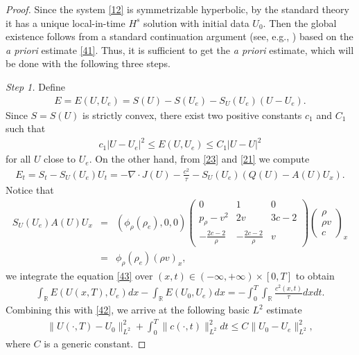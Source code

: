\documentclass{article}
\theoremstyle{plain}
\begin{document}
\begin{proof}
Since the system  \eqref{12} is symmetrizable hyperbolic, by the standard theory
\cite{majda1984compressible, kato1975cauchy} it has a unique local-in-time $H^s$ solution with initial data $U_0$. Then the global existence follows from a standard continuation argument (see, e.g., \cite{yong2004entropy}) based on the {\it a priori} estimate \eqref{41}. Thus, it is sufficient to get the {\it a priori} estimate, which will be done with the following three steps.


\emph{Step 1.} Define
\begin{eqnarray*}
E=E(U,U_e) = S(U)-S(U_e)-S_U(U_e)(U-U_e).
\end{eqnarray*}
Since $S=S(U)$ is strictly convex, there exist two positive constants $c_1$ and $C_1$ such that
\begin{eqnarray}\label{42}
c_1 |U-U_e|^2 \le E(U,U_e) \le C_1 |U-U|^2
\end{eqnarray}
for all $U$ close to $U_e$. On the other hand, from \eqref{23} and \eqref{21} we compute
\begin{eqnarray}\label{43}
E_t = S_t - S_U(U_e)U_t = -\nabla \cdot J(U) - \frac{c^2}{\tau} - S_U(U_e)(Q(U) - A(U)U_x).
\end{eqnarray}
Notice that
\begin{eqnarray*}
S_U(U_e) A(U) U_x &=& (\phi_\rho(\rho_e), 0, 0)
\left( \begin{array}{ccc}
0 & 1 & 0 \\
p_\rho-v^2 & 2v & 3c-2 \\
-\frac{2c-2}{\rho} & -\frac{2c-2}{\rho} & v
\end{array} \right)
\left( \begin{array}{ccc}
\rho \\ \rho v \\ c \end{array} \right)_x \\
&=& \phi_\rho(\rho_e) (\rho v )_x,
\end{eqnarray*}
we integrate the equation \eqref{43} over $(x, t)\in(-\infty, + \infty)\times[0,T]$ to obtain
\begin{eqnarray*}
\int_\mathbb{R}E(U(x, T), U_e)dx - \int_\mathbb{R} E(U_0, U_e)dx = - \int_0^T\int_\mathbb{R} \frac{c^2(x, t)}{\tau} dx dt.
\end{eqnarray*}
Combining this with \eqref{42}, we arrive at the following basic $L^2$ estimate
\begin{eqnarray}\label{44}
\|U(\cdot, T)-U_0\|^2_{L^2} + \int_0^T \|c(\cdot, t)\|^2_{L^2}dt \le C\|U_0 - U_e\|^2_{L^2},
\end{eqnarray}
where $C$ is a generic constant.


\end{proof}
\end{document}
